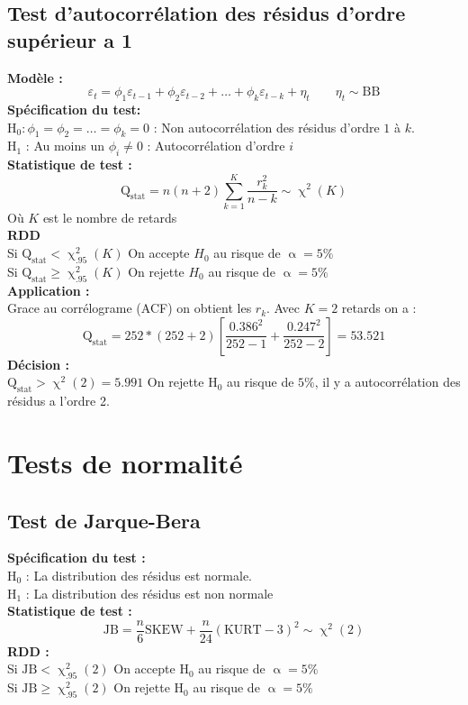 \documentclass[A4paper]{article}
\begin{document}
\newpage
\subsection{Test d'autocorrélation des résidus d'ordre supérieur a 1}
\textbf{Modèle :}
\begin{equation*}
		\varepsilon_t = \phi_1 \varepsilon_{t-1} + \phi_2 \varepsilon_{t-2} + \ldots + \phi_k \varepsilon_{t-k} + \eta_t \qquad \eta_t \sim \text{BB}
\end{equation*}
\textbf{Spécification du test: } \\
H$_0 : \phi_1 = \phi_2 = \ldots = \phi_k = 0$ : Non autocorrélation des résidus d'ordre $1$ à $k$. \\
H$_1$ : Au moins un $\phi_i \neq 0$ : Autocorrélation d'ordre $i$ \\
\textbf{Statistique de test :}
\begin{equation*}
		\text{Q}_{\text{stat}} = n(n+2) \sum_{k=1}^K \frac{r_k^2}{n-k} \sim \upchi^2(K)
\end{equation*}
Où $K$ est le nombre de retards \\
 \textbf{RDD}\\
Si $\text{Q}_{\text{stat}} < \upchi^2_{.95}(K)$ On accepte $H_0$ au risque de $\upalpha = 5\%$\\
Si $\text{Q}_{\text{stat}} \geq \upchi^2_{.95}(K)$ On rejette $H_0$ au risque de $\upalpha = 5\%$ \\
\textbf{Application :} \\
Grace au corrélograme (ACF) on obtient les $r_k$. Avec $K=2$ retards on a : 
\begin{equation}
		\text{Q}_{\text{stat}} = 252 * (252+2) \left[ \frac{0.386^2}{252-1} + \frac{0.247^2}{252-2} \right] = 53.521
\end{equation}
\textbf{Décision : }\\
$\text{Q}_{\text{stat}} > \upchi^2(2) = 5.991$ On rejette H$_0$ au risque de $5\%$, il y a autocorrélation des résidus a l'ordre 2.
\newpage
\section{Tests de normalité}
\subsection{Test de Jarque-Bera}
\textbf{Spécification du test :}\\
H$_0$ : La distribution des résidus est normale. \\
H$_1$ : La distribution des résidus est non normale\\
\textbf{Statistique de test :}
\begin{equation*}
	\text{JB} = \frac{n}{6} \text{SKEW} + \frac{n}{24} (\text{KURT} -3)^2 \sim \upchi^2(2)		
\end{equation*}
\textbf{RDD :} \\
Si  $\text{JB} < \upchi^2_{.95}(2)$  On accepte  H$_0$  au risque de  $\upalpha = 5\%$ \\
Si  $\text{JB} \ge  \upchi^2_{.95}(2)$  On rejette  H$_0$  au risque de  $\upalpha = 5\%$  \\
\end{document}
